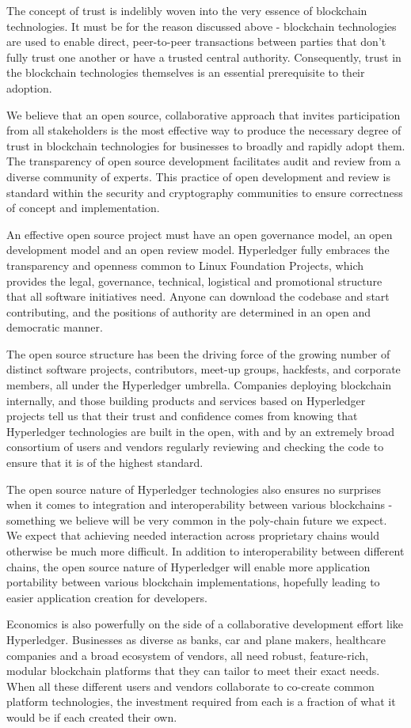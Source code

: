 The concept of trust is indelibly woven into the very essence of blockchain technologies. It must be for the reason discussed above - blockchain technologies are used to enable direct, peer-to-peer transactions between parties that don’t fully trust one another or have a trusted central authority. Consequently, trust in the blockchain technologies themselves is an essential prerequisite to their adoption. 

We believe that an open source, collaborative approach that invites participation from all stakeholders is the most effective way to produce the necessary degree of trust in blockchain technologies for businesses to broadly and rapidly adopt them. The transparency of open source development facilitates audit and review from a diverse community of experts. This practice of open development and review is standard within the security and cryptography communities to ensure correctness of concept and implementation.

An effective open source project must have an open governance model, an open development model and an open review model.  Hyperledger fully embraces the transparency and openness common to Linux Foundation Projects, which provides the legal, governance, technical, logistical and promotional structure that all software initiatives need. Anyone can download the codebase and start contributing, and the positions of authority are determined in an open and democratic manner. 

The open source structure has been the driving force of the growing number of distinct software projects, contributors, meet-up groups, hackfests, and corporate members, all under the Hyperledger umbrella.  Companies deploying blockchain internally, and those building products and services based on Hyperledger projects tell us that their trust and confidence comes from knowing that Hyperledger technologies are built in the open, with and by an extremely broad consortium of users and vendors regularly reviewing and checking the code to ensure that it is of the highest standard. 

The open source nature of Hyperledger technologies also ensures no surprises when it comes to integration and interoperability between various blockchains - something we believe will be very common in the poly-chain future we expect. We expect that achieving needed interaction across proprietary chains would otherwise be much more difficult. In addition to interoperability between different chains, the open source nature of Hyperledger will enable more application portability between various blockchain implementations, hopefully leading to easier application creation for developers.

Economics is also powerfully on the side of a collaborative development effort like Hyperledger. Businesses as diverse as banks, car and plane makers, healthcare companies and a broad ecosystem of vendors, all need robust, feature-rich, modular blockchain platforms that they can tailor to meet their exact needs. When all these different users and vendors collaborate to co-create common platform technologies, the investment required from each is a fraction of what it would be if each created their own.
